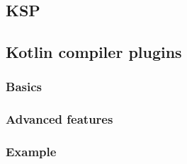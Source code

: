 \subsection{KSP}
\subsection{Kotlin compiler plugins}
\subsubsection{Basics}
\subsubsection{Advanced features}
\subsubsection{Example}
